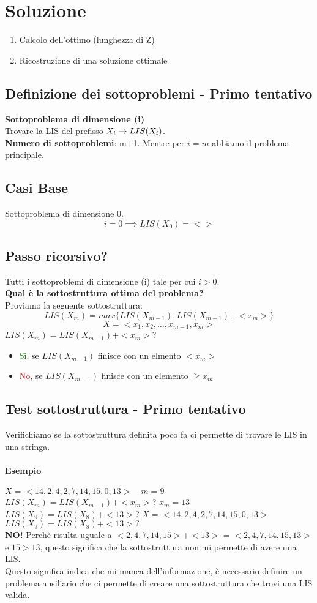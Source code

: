 \section{Soluzione}
\begin{enumerate}
    \item Calcolo dell'ottimo (lunghezza di Z)
    \item Ricostruzione di una soluzione ottimale
\end{enumerate}
\subsection{Definizione dei sottoproblemi - Primo tentativo}
\textbf{Sottoproblema di dimensione (i)}\\
Trovare la LIS del prefisso $X_i \rightarrow LIS(X_i)$.\\
\textbf{Numero di sottoproblemi}: m+1.
Mentre per $i=m$ abbiamo il problema principale.
\subsection{Casi Base}
Sottoproblema di dimensione 0.\\
\[ i=0 \implies LIS(X_0) = <> \]
\subsection{Passo ricorsivo?}
\ra Tutti i sottoproblemi di dimensione (i) tale per cui $i > 0$.\\
\textbf{Qual è la sottostruttura ottima del problema?}\\
Proviamo la seguente sottostruttura:
\[LIS(X_m) = max\{LIS(X_{m-1}), LIS(X_{m-1})+<x_m>\}\]
\[X = <x_1, x_2, \dots, x_{m-1},x_m>\]
$LIS(X_m) = LIS(X_{m-1})+<x_m>$?
\begin{itemize}
    \item \textcolor{green}{Sì}, se $LIS(X_{m-1})$ finisce con un elmento $< x_m>$
    \item \textcolor{red}{No}, se $LIS(X_{m-1})$ finisce con un elemento $\geq x_m$
\end{itemize}
\subsection{Test sottostruttura - Primo tentativo}
Verifichiamo se la sottostruttura definita poco fa ci permette di trovare le LIS in
una stringa.
\paragraph*{Esempio} 
$ X = <14, 2, 4, 2, 7, 14, 15, 0, 13> \quad m=9$\\
$LIS(X_m) = LIS(X_{m-1})+<x_m>$? $x_m = 13$\\
$LIS(X_9) = LIS(X_8) + <13>$? $X=<14, 2, 4, 2, 7, 14, 15, 0, 13>$ \\
$LIS(X_9) = LIS(X_8) + <13> ?$\\
\textbf{NO!} Perchè risulta uguale a $<2, 4, 7, 14, 15> + <13> = <2, 4, 7, 14, 15, 13>$ e $15>13$, questo
significa che la sottostruttura non mi permette di avere una LIS.\\
Questo significa indica che mi manca dell'informazione, è necessario definire un problema
ausiliario che ci permette di creare una sottostruttura che trovi una LIS valida.
